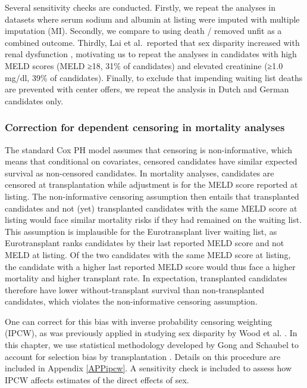 \documentclass[11pt,twoside,]{book}
\begin{document}
Several sensitivity checks are conducted. Firstly, we repeat the analyses in datasets
where serum sodium and albumin at listing were imputed with multiple imputation (MI).
Secondly, we compare to using death / removed unfit as a combined outcome.
Thirdly, Lai et al.~reported that sex
disparity increased with renal dysfunction \citep{laiHeightContributesGender2010},
motivating us to repeat the analyses
in candidates with high MELD scores (MELD ≥18, 31\% of candidates) and
elevated creatinine (≥1.0 mg/dl, 39\% of candidates). Finally, to exclude
that impending waiting list deaths are prevented with center offers,
we repeat the analysis in Dutch and German candidates only.

\subsubsection{Correction for dependent censoring in mortality analyses}\label{correction-for-dependent-censoring-in-mortality-analyses}

The standard Cox PH model assumes that censoring is non-informative, which means
that conditional on covariates, censored candidates have similar expected
survival as non-censored candidates. In mortality analyses, candidates are censored
at transplantation while adjustment is for the MELD score reported at listing.
The non-informative censoring assumption then entails that transplanted candidates
and not (yet) transplanted candidates with the same MELD score at listing would face
similar mortality risks if they had remained on the waiting list.
\newpage
This assumption is implausible for the Eurotransplant liver waiting list, as
Eurotransplant ranks candidates by their last reported MELD score and
not MELD at listing. Of the two candidates with the same
MELD score at listing, the candidate with a higher last reported MELD score would
thus face a higher mortality and higher transplant rate. In expectation,
transplanted candidates therefore have lower without-transplant survival than
non-transplanted candidates, which violates the non-informative censoring
assumption.

One can correct for this bias with inverse probability censoring weighting (IPCW),
as was previously applied in studying sex disparity by Wood et al. \citep{woodCorrectingSexDisparity2021}. In this chapter, we use statistical methodology
developed by Gong and Schaubel to account for selection bias by transplantation \citep{gongEstimatingAverageTreatment2017}. Details on this procedure are included
in Appendix \ref{APPipcw}. A sensitivity check is included to assess how IPCW
affects estimates of the direct effects of sex.
\end{document}
